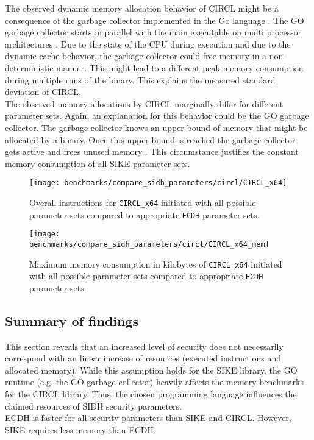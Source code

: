 The observed dynamic memory allocation behavior of \gls{CIRCL} might be a consequence of the garbage collector implemented in the Go language \parencite{Hudson:GGC}. The GO garbage collector starts in parallel with the main executable on multi processor architectures \parencite{go2020faq}. Due to the state of the CPU during execution and due to the dynamic cache behavior, the garbage collector could free memory in a non-deterministic manner. This might lead to a different peak memory consumption during multiple runs of the binary. This explains the measured standard deviation of \gls{CIRCL}. \\

The observed memory allocations by \gls{CIRCL} marginally differ for different parameter sets. Again, an explanation for this behavior could be the GO garbage collector. The garbage collector knows an upper bound of memory that might be allocated by a binary. Once this upper bound is reached the garbage collector gets active and frees unused memory \parencite{Hudson:GGC}. This circumstance justifies the constant memory consumption of all \gls{SIKE} parameter sets.

\begin{figure}[H]
  \centering
  \texttt{[image: benchmarks/compare\_sidh\_parameters/circl/CIRCL\_x64]}
  \caption[Instructions for all parameter sets via \texttt{CIRCL\_x64}]
  {Overall instructions for \texttt{CIRCL\_x64} initiated with all possible parameter sets compared to appropriate \texttt{ECDH} parameter sets.}
  \label{fig:results_all_curves_circl}
\end{figure}

\begin{figure}[H]
  \centering
  \texttt{[image: benchmarks/compare\_sidh\_parameters/circl/CIRCL\_x64\_mem]}
  \caption[Memory consumption for all parameter sets via \texttt{CIRCL\_x64}]
  {Maximum memory consumption in kilobytes of \texttt{CIRCL\_x64} initiated with all possible parameter sets compared to appropriate \texttt{ECDH} parameter sets.}
  \label{fig:results_all_curves_circl_mem}
\end{figure}

\subsection{Summary of findings}\label{sec:findings_sidh_sec_levels}
This section reveals that an increased level of security does not necessarily correspond with an linear increase of resources (executed instructions and allocated memory). While this assumption holds for the \gls{SIKE} library, the GO runtime (e.g. the GO garbage collector) heavily affects the memory benchmarks for the \gls{CIRCL} library. Thus, the chosen programming language influences the claimed resources of \gls{SIDH} security parameters.\\
\gls{ECDH} is faster for all security parameters than \gls{SIKE} and \gls{CIRCL}. However, \gls{SIKE} requires less memory than \gls{ECDH}.

